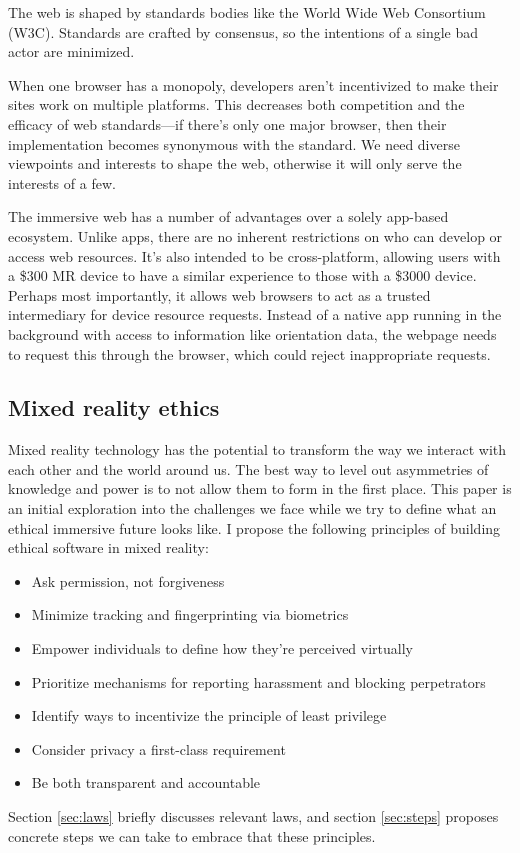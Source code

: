 The web is shaped by standards bodies like the World Wide Web Consortium (W3C). Standards are crafted by consensus, so the intentions of a single bad actor are minimized.

When one browser has a monopoly, developers aren't incentivized to make their sites work on multiple platforms. This decreases both competition and the efficacy of web standards---if there's only one major browser, then their implementation becomes synonymous with the standard. We need diverse viewpoints and interests to shape the web, otherwise it will only serve the interests of a few.

The immersive web has a number of advantages over a solely app-based ecosystem. Unlike apps, there are no inherent restrictions on who can develop or access web resources. It's also intended to be cross-platform, allowing users with a \$300 MR device to have a similar experience to those with a \$3000 device. Perhaps most importantly, it allows web browsers to act as a trusted intermediary for device resource requests. Instead of a native app running in the background with access to information like orientation data, the webpage needs to request this through the browser, which could reject inappropriate requests.


\subsection{Mixed reality ethics}

Mixed reality technology has the potential to transform the way we interact with each other and the world around us. The best way to level out asymmetries of knowledge and power is to not allow them to form in the first place. This paper is an initial exploration into the challenges we face while we try to define what an ethical immersive future looks like. I propose the following principles of building ethical software in mixed reality:

\begin{itemize}
	\item Ask permission, not forgiveness
	\item Minimize tracking and fingerprinting via biometrics
	\item Empower individuals to define how they're perceived virtually
	\item Prioritize mechanisms for reporting harassment and blocking perpetrators
	\item Identify ways to incentivize the principle of least privilege
	\item Consider privacy a first-class requirement
	\item Be both transparent and accountable
\end{itemize}


Section \ref{sec:laws} briefly discusses relevant laws, and section \ref{sec:steps} proposes concrete steps we can take to embrace that these principles.
